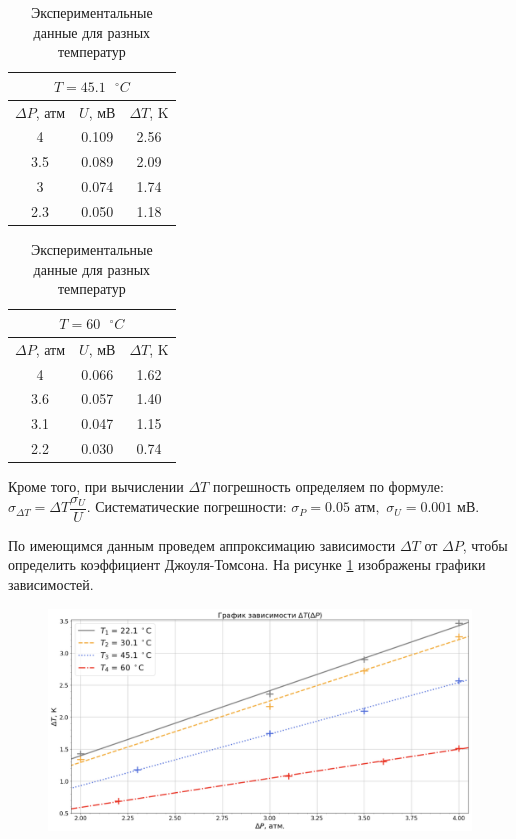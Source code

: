 \documentclass[a4paper,12pt]{article}
\theoremstyle{definition}
\begin{document}
	\begin{table}[H]
		\begin{minipage}{.49\linewidth}
			\centering
			\begin{tabular}{|c|c|c|}
				\hline
				\multicolumn{3}{|c|}{$ T = 45.1 \text{ } ^\circ C $} \\ \hline
				$ \Delta P $, атм &  $ U $, мВ &  $ \Delta T $, K  \\
				\hline
				4 & 0.109 & 2.56 \\ \hline
				3.5 & 0.089 & 2.09 \\ \hline
				3 & 0.074 & 1.74 \\ \hline
				2.3 & 0.050 & 1.18 \\ \hline
			\end{tabular}
		\end{minipage}
		\begin{minipage}{.49\linewidth}
			\centering
			\begin{tabular}{|c|c|c|}
				\hline
				\multicolumn{3}{|c|}{$ T = 60 \text{ } ^\circ C $} \\ \hline
				$ \Delta P $, атм &  $ U $, мВ &  $ \Delta T $, K  \\
				\hline
				4 & 0.066 & 1.62 \\ \hline
				3.6 & 0.057 & 1.40 \\ \hline
				3.1 & 0.047 & 1.15 \\ \hline
				2.2 & 0.030 & 0.74 \\ \hline
				
			\end{tabular}
		\end{minipage}
		\caption{Экспериментальные данные для разных температур}
	\end{table}
	
	Кроме того, при вычислении $ \Delta T $ погрешность определяем по формуле:  $\sigma_{\Delta T} = \Delta T \dfrac{\sigma_U}{U}$. Систематические погрешности: $\sigma_P = 0.05 \text{ атм},$ $\sigma_U = 0.001 \text{ мВ}.$
	
	По имеющимся данным проведем аппроксимацию зависимости $ \Delta T $ от $ \Delta P $, чтобы определить коэффициент Джоуля-Томсона. На рисунке \ref{ris} изображены графики зависимостей.
	
	\begin{figure}[!h]
		\centering
		\includegraphics[scale = 0.55]{tp}
		\label{ris}
	\end{figure}
	
\end{document}
